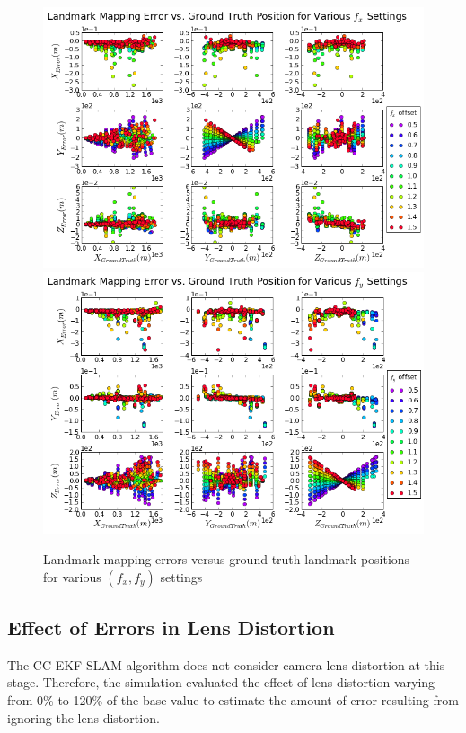 \begin{figure}[h]
  \centering
  \includegraphics[width=13cm,keepaspectratio=true]{./Figures/SimulationFigures/Figure41.png}
  \includegraphics[width=13cm,keepaspectratio=true]{./Figures/SimulationFigures/Figure42.png}
  \caption{Landmark mapping errors versus ground truth
    landmark positions for various $(f_x, f_y)$ settings}
  \label{fig:simfig41-42}
\end{figure}
\FloatBarrier

\subsection{Effect of Errors in Lens Distortion}
The CC-EKF-SLAM algorithm does not consider camera lens distortion
at this stage. Therefore, the simulation evaluated the effect of
lens distortion varying from 0\% to 120\% of the base value to
estimate the amount of error resulting from ignoring the lens distortion.

